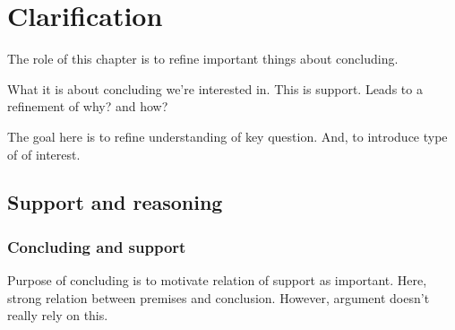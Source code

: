 \chapter{Clarification}
\label{cha:clarification}

\begin{note}
  The role of this chapter is to refine important things about concluding.

  What it is about concluding we're interested in.
  This is support.
  Leads to a refinement of why? and how?
\end{note}

\begin{note}
  The goal here is to refine understanding of key question.
  And, to introduce type of \scen{} of interest.
\end{note}

\section{Support and reasoning}
\label{sec:clarification:support-reasoning}

\subsection{Concluding and support}
\label{sec:clarification:support}

\begin{note}
  \color{red}
  Purpose of concluding is to motivate relation of support as important.
  Here, strong relation between premises and conclusion.
  However, argument doesn't really rely on this.
\end{note}

